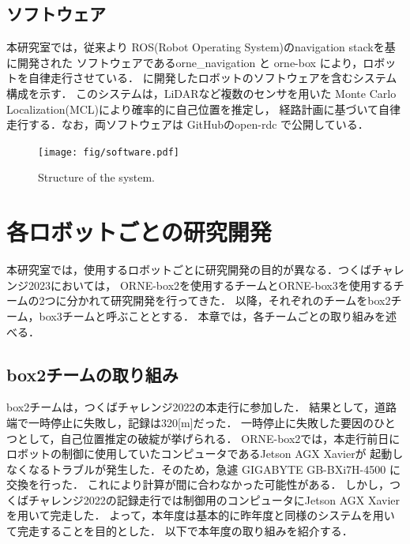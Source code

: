\documentclass[twocolumn, 9pt]{jsproceedings}
\begin{document}
\subsection{ソフトウェア}
本研究室では，従来より ROS(Robot Operating System)\cite{ros}のnavigation stack\cite{navigation}を基に開発された
ソフトウェアであるorne\_navigation\cite{orne-navigation} と orne-box\cite{orne-box} により，ロボットを自律走行させている．
に開発したロボットのソフトウェアを含むシステム構成を示す．
このシステムは，LiDARなど複数のセンサを用いた Monte Carlo Localization(MCL)により確率的に自己位置を推定し， 
経路計画に基づいて自律走行する．なお，両ソフトウェアは GitHubのopen-rdc\cite{open-rdc} で公開している．

\begin{figure}[h!]
  \centering
  \texttt{[image: fig/software.pdf]}
  \caption{Structure of the system.}
  \label{fig:soft-fig}
\end{figure}

\vspace*{2mm}

\section{各ロボットごとの研究開発}
本研究室では，使用するロボットごとに研究開発の目的が異なる．つくばチャレンジ2023においては，
ORNE-box2を使用するチームとORNE-box3を使用するチームの2つに分かれて研究開発を行ってきた．
以降，それぞれのチームをbox2チーム，box3チームと呼ぶこととする．
本章では，各チームごとの取り組みを述べる．

\subsection{box2チームの取り組み}


box2チームは，つくばチャレンジ2022の本走行に参加した．
結果として，道路端で一時停止に失敗し，記録は320[m]だった．
一時停止に失敗した要因のひとつとして，自己位置推定の破綻が挙げられる．
ORNE-box2では，本走行前日にロボットの制御に使用していたコンピュータであるJetson AGX Xavierが
起動しなくなるトラブルが発生した．そのため，急遽 GIGABYTE GB-BXi7H-4500 に交換を行った．
これにより計算が間に合わなかった可能性がある．
しかし，つくばチャレンジ2022の記録走行では制御用のコンピュータにJetson AGX Xavierを用いて完走した．
よって，本年度は基本的に昨年度と同様のシステムを用いて完走することを目的とした．
以下で本年度の取り組みを紹介する．
\end{document}
